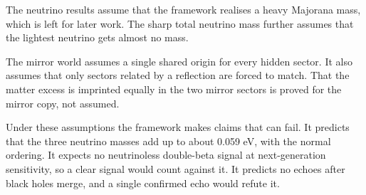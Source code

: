 \documentclass[11pt]{article}
\theoremstyle{definition}
\theoremstyle{plain}
\begin{document}
The neutrino results assume that the framework realises a heavy Majorana mass, which is left for later work. The sharp total neutrino mass further assumes that the lightest neutrino gets almost no mass.

The mirror world assumes a single shared origin for every hidden sector. It also assumes that only sectors related by a reflection are forced to match. That the matter excess is imprinted equally in the two mirror sectors is proved for the mirror copy, not assumed.

Under these assumptions the framework makes claims that can fail. It predicts that the three neutrino masses add up to about 0.059 eV, with the normal ordering. It expects no neutrinoless double-beta signal at next-generation sensitivity, so a clear signal would count against it. It predicts no echoes after black holes merge, and a single confirmed echo would refute it.
\end{document}

